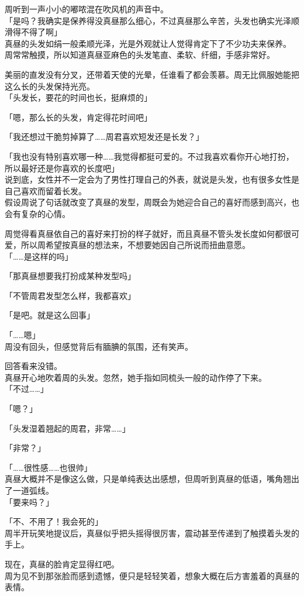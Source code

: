 周听到一声小小的嘟哝混在吹风机的声音中。\\

「是吗？我确实是保养得没真昼那么细心，不过真昼那么辛苦，头发也确实光泽顺滑得不得了啊」\\

真昼的头发如绢一般柔顺光泽，光是外观就让人觉得肯定下了不少功夫来保养。\\

周常常触摸，所以知道真昼亚麻色的头发笔直、柔软、纤细，手感非常好。

美丽的直发没有分叉，还带着天使的光晕，任谁看了都会羡慕。周无比佩服她能把这么长的头发保持光亮。\\

「头发长，要花的时间也长，挺麻烦的」

「嗯，那么长的头发，肯定得花时间吧」

「我还想过干脆剪掉算了……周君喜欢短发还是长发？」

「我也没有特别喜欢哪一种……我觉得都挺可爱的。不过我喜欢看你开心地打扮，所以最好还是你喜欢的长度吧」\\

说到底，女性并不一定会为了男性打理自己的外表，就说是头发，也有很多女性是自己喜欢而留着长发。\\

假设周说了句话就改变了真昼的发型，周既会为她迎合自己的喜好而感到高兴，也会有复杂的心情。

周觉得看真昼依自己的喜好来打扮的样子就好，而且真昼不管头发长度如何都很可爱，所以周希望按真昼的想法来，不想要她因自己所说而扭曲意愿。\\

「……是这样的吗」

「那真昼想要我打扮成某种发型吗」

「不管周君发型怎么样，我都喜欢」

「是吧。就是这么回事」

「……嗯」\\

周没有回头，但感觉背后有腼腆的氛围，还有笑声。

回答看来没错。\\

真昼开心地吹着周的头发。忽然，她手指如同梳头一般的动作停了下来。\\

「不过……」

「嗯？」

「头发湿着翘起的周君，非常……」

「非常？」

「……很性感……也很帅」\\

真昼大概并不是像这么做，只是单纯表达出感想，但周听到真昼的低语，嘴角翘出了一道弧线。\\

「要来吗？」

「不、不用了！我会死的」\\

周半开玩笑地提议后，真昼似乎把头摇得很厉害，震动甚至传递到了触摸着头发的手上。

现在，真昼的脸肯定显得红吧。\\

周为见不到那张脸而感到遗憾，便只是轻轻笑着，想象大概在后方害羞着的真昼的表情。

